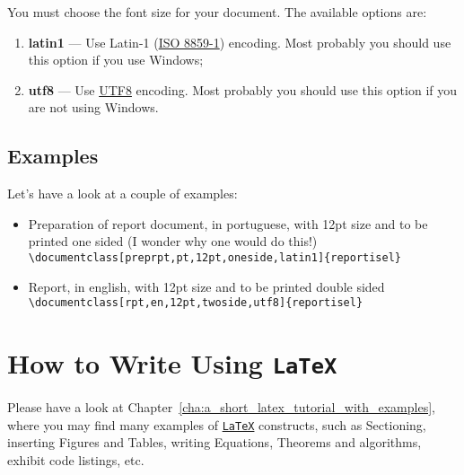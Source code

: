 You must choose the font size for your document. The available options are:
\begin{enumerate}
	\item \textbf{latin1} --- Use Latin-1 (\href{http://en.wikipedia.org/wiki/ISO/IEC_8859-1}{ISO 8859-1}) encoding.  Most probably you should use this option if you use Windows;
	\item \textbf{utf8} --- Use \href{http://en.wikipedia.org/wiki/UTF-8}{UTF8} encoding.    Most probably you should use this option if you are not using Windows.
\end{enumerate}

\subsection{Examples} %
\label{ssec:examples}

Let's have a look at a couple of examples:

\begin{itemize}
	\item Preparation of report document, in portuguese, with 12pt size and to be printed one sided (I wonder why one would do this!)\\
	\verb!\documentclass[preprpt,pt,12pt,oneside,latin1]{reportisel}!
	\item Report, in english, with 12pt size and to be printed double sided\\
	\verb!\documentclass[rpt,en,12pt,twoside,utf8]{reportisel}!
\end{itemize}

\section{How to Write Using \texttt{LaTeX}} %
\label{sec:how_to_write_using_latex}

Please have a look at Chapter~\ref{cha:a_short_latex_tutorial_with_examples}, where you may find many examples of \href{http://tobi.oetiker.ch/lshort/lshort.pdf}{\texttt{LaTeX}} constructs, such as Sectioning, inserting Figures and Tables, writing Equations, Theorems and algorithms, exhibit code listings, etc.

